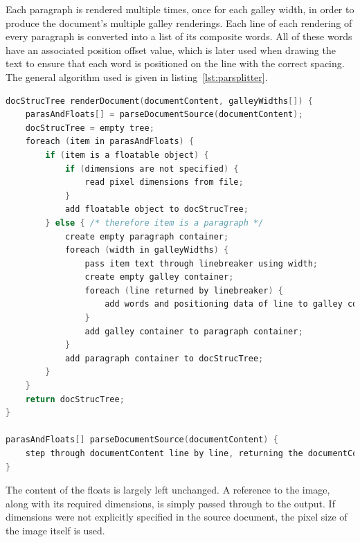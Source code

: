 Each paragraph is rendered multiple times, once for each galley width, in order to produce the document's multiple galley renderings. Each line of each rendering of every paragraph is converted into a list of its composite words. All of these words have an associated position offset value, which is later used when drawing the text to ensure that each word is positioned on the line with the correct spacing. The general algorithm used is given in listing~\ref{lst:parsplitter}.


\begin{lstlisting}[label=lst:parsplitter,language=c,captionpos=b,float,caption={[Algorithm followed by the galley renderer]The algorithm followed by the galley renderer. Firstly the source of the document is parsed to break it into its initial logical blocks: one block per paragraph and one block per float, in the order encountered in the document source. These blocks are then processed further depending on their type. Floats may be probed for their pixel dimensions if no size was specified, and are then added to the document structure tree. Paragraphs have their content passed through a line breaking algorithm, once for each specified width.}]
docStrucTree renderDocument(documentContent, galleyWidths[]) {
    parasAndFloats[] = parseDocumentSource(documentContent);
    docStrucTree = empty tree;
    foreach (item in parasAndFloats) {
        if (item is a floatable object) {
            if (dimensions are not specified) {
                read pixel dimensions from file;
            }
            add floatable object to docStrucTree;
        } else { /* therefore item is a paragraph */
            create empty paragraph container;
            foreach (width in galleyWidths) {
                pass item text through linebreaker using width;
                create empty galley container;
                foreach (line returned by linebreaker) {
                    add words and positioning data of line to galley container;
                }
                add galley container to paragraph container;
            }
            add paragraph container to docStrucTree;
        }
    }
    return docStrucTree;
}

parasAndFloats[] parseDocumentSource(documentContent) {
    step through documentContent line by line, returning the documentContent broken into an array of strings with one element per paragraph and per floatable object;
}

\end{lstlisting}


The content of the floats is largely left unchanged. A reference to the image, along with its required dimensions, is simply passed through to the output. If dimensions were not explicitly specified in the source document, the pixel size of the image itself is used.

